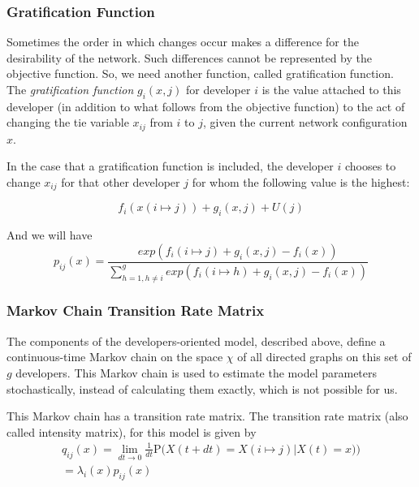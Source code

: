 \documentclass[11pt]{report}
\begin{document}
\subsubsection{Gratification Function}
Sometimes the order in which changes occur makes a difference for the desirability of the network. Such differences cannot be represented by the objective function. So, we need another function, called gratification function. \\

The \textit{gratification function} $g_i(x,j)$ for developer $i$ is the value attached to this developer (in addition to what follows from the objective function) to the act of changing the tie variable $x_{ij}$ from $i$ to $j$, given the current network configuration $x$. 

In the case that a gratification function is included, the developer $i$ chooses to change $x_{ij}$ for that other developer $j$ for whom the following value \cite{Snijders2004} is the highest:

\begin{equation}
f_i(x(i \mapsto j)) + g_i(x, j) + U(j)
\end{equation} 

And we will have 
\begin{equation}
\label{ObjectiveFunctionWithGratification}
p_{ij}(x) = \frac{exp(f_i(i \mapsto j) + g_i(x, j) - f_i(x))}{\sum_{h=1, h \neq i}^{g} exp(f_i(i \mapsto h) + g_i(x, j) - f_i(x))}
\end{equation}

\subsubsection{Markov Chain Transition Rate Matrix}
The components of the developers-oriented model, described above, define a continuous-time Markov chain on the space $\chi$ of all directed graphs on this set of $g$ developers. This Markov chain is used to estimate the model parameters stochastically, instead of calculating them exactly, which is not possible for us.

This Markov chain has a transition rate matrix. The transition rate matrix (also called intensity matrix), for this model is given by 
\begin{multline}
\label{intensityMatrix}
q_{ij}(x) = \lim_{dt \to 0} \frac{1}{dt} \mathrm {P} \big({X(t + dt) = X(i \mapsto j) | X(t) = x)}\big) \\ = \lambda_i(x) p_{ij}(x)
\end{multline}
\end{document}
